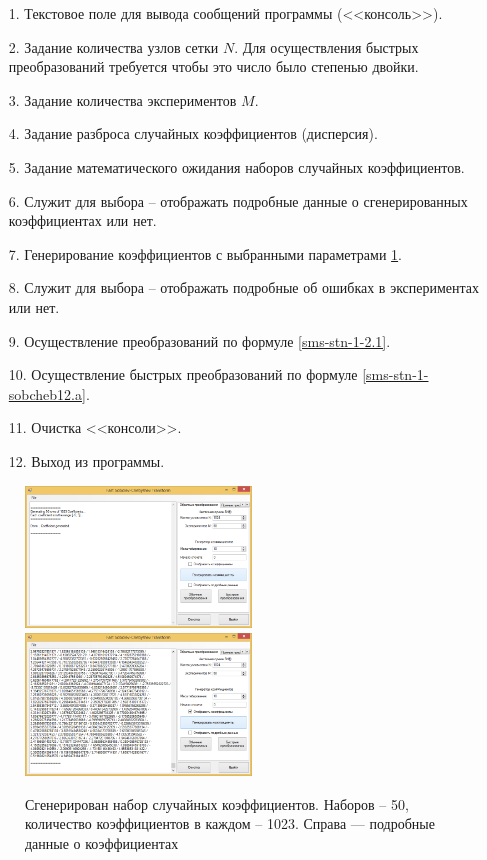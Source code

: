 \begin{enumerate}
	\item[1.] Текстовое поле для вывода сообщений программы (<<консоль>>).
	\item[2.] Задание количества узлов сетки $N$. Для осуществления быстрых преобразований требуется чтобы это число было степенью двойки.
	\item[3.] Задание количества экспериментов $M$.
	\item[4.] Задание разброса случайных коэффициентов (дисперсия).
	\item[5.] Задание математического ожидания наборов случайных коэффициентов.
	\item[6.] Служит для выбора -- отображать подробные данные о сгенерированных коэффициентах или нет.
	\item[7.] Генерирование коэффициентов с выбранными параметрами \ref{sms-stn-1-img2}.
	\item[8.] Служит для выбора -- отображать подробные об ошибках в экспериментах или нет.
	\item[9.] Осуществление преобразований по формуле \eqref{sms-stn-1-2.1}.
	\item[10.] Осуществление быстрых преобразований по формуле \eqref{sms-stn-1-sobcheb12.a}.
	\item[11.] Очистка <<консоли>>.
	\item[12.] Выход из программы.
\end{enumerate}

\begin{figure}[H]
	\begin{center}
		\includegraphics[width=170pt]{pictures/sms-stn-1(2)}
		\quad
		\includegraphics[width=170pt]{pictures/sms-stn-1(3)}
		\caption{
			Сгенерирован набор случайных коэффициентов. Наборов -- 50, количество коэффициентов в каждом -- 1023. Справа --- подробные данные о коэффициентах
		}\label{sms-stn-1-img2}
	\end{center}
\end{figure}

